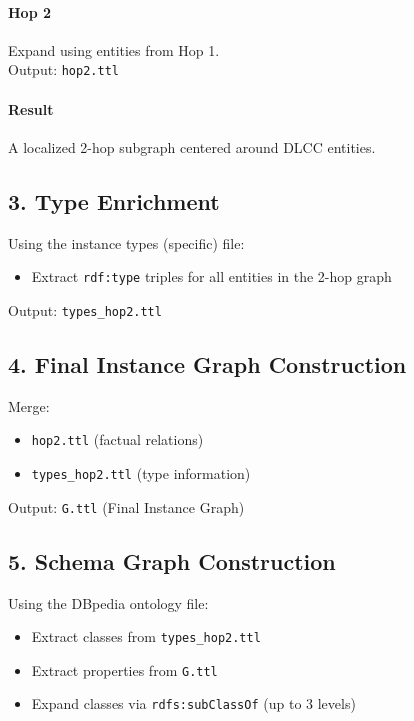 \documentclass[a4paper,oneside,bibliography=totoc]{scrartcl}
\begin{document}
\paragraph{Hop 2}
Expand using entities from Hop 1. \\
Output: \texttt{hop2.ttl}

\paragraph{Result}
A localized 2-hop subgraph centered around DLCC entities.

\subsection{3. Type Enrichment}

Using the instance types (specific) file:

\begin{itemize}
    \item Extract \texttt{rdf:type} triples for all entities in the 2-hop graph
\end{itemize}

\noindent Output: \texttt{types\_hop2.ttl}

\subsection{4. Final Instance Graph Construction}

Merge:
\begin{itemize}
    \item \texttt{hop2.ttl} (factual relations)
    \item \texttt{types\_hop2.ttl} (type information)
\end{itemize}

\noindent Output: \texttt{G.ttl} (Final Instance Graph)

\subsection{5. Schema Graph Construction}

Using the DBpedia ontology file:

\begin{itemize}
    \item Extract classes from \texttt{types\_hop2.ttl}
    \item Extract properties from \texttt{G.ttl}
    \item Expand classes via \texttt{rdfs:subClassOf} (up to 3 levels)
\end{itemize}
\end{document}

